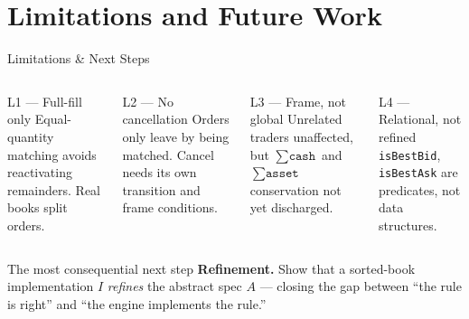 \section{Limitations and Future Work}

\begin{frame}{Limitations \& Next Steps}

\begin{columns}[T]
\begin{block}{L1 --- Full-fill only}
Equal-quantity matching avoids reactivating remainders. Real books split orders.
\end{block}

\begin{block}{L2 --- No cancellation}
Orders only leave by being matched. Cancel needs its own transition and frame conditions.
\end{block}

\begin{block}{L3 --- Frame, not global}
Unrelated traders unaffected, but $\sum \texttt{cash}$ and $\sum \texttt{asset}$ conservation not yet discharged.
\end{block}

\begin{block}{L4 --- Relational, not refined}
\texttt{isBestBid}, \texttt{isBestAsk} are predicates, not data structures.
\end{block}
\end{columns}

\vspace{2mm}

\begin{block}{The most consequential next step}
\textbf{Refinement.} Show that a sorted-book implementation $I$ \emph{refines} the abstract spec $A$ --- closing the gap between ``the rule is right'' and ``the engine implements the rule.''
\end{block}

\end{frame}
